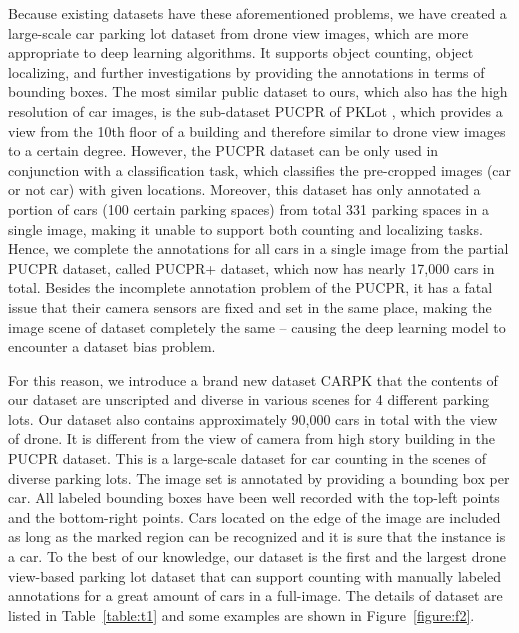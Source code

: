 \documentclass[10pt,twocolumn,letterpaper]{article}
\begin{document}
Because existing datasets have these aforementioned problems, we have created a large-scale car parking lot dataset from drone view images, which are more appropriate to deep learning algorithms. It supports object counting, object localizing, and further investigations by providing the annotations in terms of bounding boxes. %
The most similar public dataset to ours, which also has the high resolution of car images, is the sub-dataset PUCPR of PKLot \cite{01_de2015pklot}, which provides a view from the 10th floor of a building and therefore similar to drone view images to a certain degree.
%
However, the PUCPR dataset can be only used in conjunction with a classification task, which classifies the pre-cropped images (car or not car) with given locations. Moreover, this dataset has only annotated a portion of cars (100 certain parking spaces) from total 331 parking spaces in a single image, making it unable to support both counting and localizing tasks. Hence, we complete the annotations for all cars in a single image from the partial PUCPR dataset, called PUCPR+ dataset, which now has nearly 17,000 cars in total. Besides the incomplete annotation problem of the PUCPR, it has a fatal issue that their camera sensors are fixed and set in the same place, making the image scene of dataset completely the same -- causing the deep learning model to encounter a dataset bias problem. 

For this reason, we introduce a brand new dataset CARPK that the contents of our dataset are unscripted and diverse in various scenes for 4 different parking lots. Our dataset also contains approximately 90,000 cars in total with the view of drone.
%
It is different from the view of camera from high story building in the PUCPR dataset. This is a large-scale dataset for car counting in the scenes of diverse parking lots. The image set is annotated by providing a bounding box per car. All labeled bounding boxes have been well recorded with the top-left points and the bottom-right points. Cars located on the edge of the image are included as long as the marked region can be recognized and it is sure that the instance is a car. To the best of our knowledge, our dataset is the first and the largest drone view-based parking lot dataset that can support counting with manually labeled annotations for a great amount of cars in a full-image. The details of dataset are listed in Table~\ref{table:t1} and some examples are shown in Figure~\ref{figure:f2}.
\end{document}
